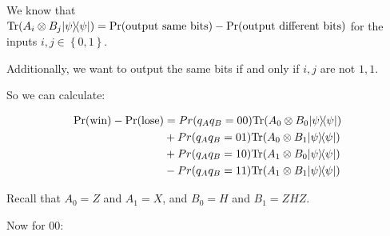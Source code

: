 \documentclass{article}
\newcommand{\ketbra}[2]{|#1\rangle\!\langle #2|}
\newcommand{\trace}{{\rm Tr}}
\newcommand{\set}[1]{{\left\{#1\right\}}}    %
\begin{document}
\begin{enumerate}
\begin{enumerate}
                We know that $\trace(A_i\otimes B_j\ketbra{\psi}{\psi})=\Pr(\text{output same bits})-\Pr(\text{output different bits})$ for the inputs $i,j\in\set{0,1}$.

                Additionally, we want to output the same bits if and only if $i,j$ are not $1,1$.

                So we can calculate:

                $$\begin{aligned}
                    \Pr(\text{win})-\Pr(\text{lose}) & = Pr(q_Aq_B=00)\trace(A_0\otimes B_0\ketbra{\psi}{\psi}) \\
                                                     & + Pr(q_Aq_B=01)\trace(A_0\otimes B_1\ketbra{\psi}{\psi}) \\
                                                     & + Pr(q_Aq_B=10)\trace(A_1\otimes B_0\ketbra{\psi}{\psi}) \\
                                                     & - Pr(q_Aq_B=11)\trace(A_1\otimes B_1\ketbra{\psi}{\psi}) \\
                  \end{aligned}$$

                Recall that $A_0=Z$ and $A_1=X$, and $B_0=H$ and $B_1=ZHZ$.

                Now for 00:


\end{enumerate}
\end{enumerate}
\end{document}
